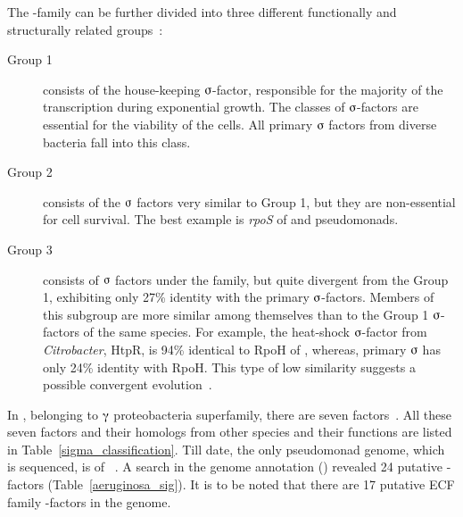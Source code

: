 The \siga{}-family can be further divided into three different
functionally and structurally related groups~\citep[][
Table~\ref{sigma_classification}]{Lonetto1992}:

\begin{description}

\item[Group 1] consists of the house-keeping $\sigmaup$-factor,
responsible for the majority of the transcription during
exponential growth. The classes of $\sigmaup$-factors are
essential for the viability of the cells. All primary $\sigmaup$
factors from diverse bacteria fall into this class.

\item[Group 2] consists of the $\sigmaup$ factors very similar to
Group 1, but they are non-essential for cell survival. The best
example is \emph{rpoS} of  and pseudomonads.

\item[Group 3] consists of $\sigmaup$ factors under the \siga{}
family, but quite divergent from the Group 1, exhibiting only 27\%
identity with the primary $\sigmaup$-factors. Members of this
subgroup are more similar among themselves than to the Group 1
$\sigmaup$-factors of the same species. For example, the
heat-shock $\sigmaup$-factor from \emph{Citrobacter}, HtpR, is
94\% identical to RpoH of , whereas,  primary
$\sigmaup$ has only 24\% identity with  RpoH. This type
of low similarity suggests a possible convergent
evolution~\citep{Lonetto1992}.

\end{description}

In , belonging to $\gammaup$ proteobacteria superfamily,
there are seven \s{} factors~\citep{Ishihama2000}. All these seven
\s{} factors and their homologs from other species and their
functions are listed in Table~\ref{sigma_classification}. Till
date, the only pseudomonad genome, which is sequenced, is of
~\citep{Stover2000}. A search in the genome annotation
() revealed 24 putative \s{}-factors
(Table~\ref{aeruginosa_sig}). It is to be noted that there are 17
putative ECF family \s{}-factors in the  genome.

